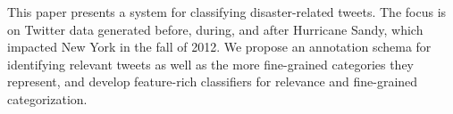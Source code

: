 This paper presents a system for classifying disaster-related tweets. The focus is on Twitter data generated before, during, and after Hurricane Sandy, which impacted New York in the fall of 2012. We propose an annotation schema for identifying relevant tweets as well as the more fine-grained categories they represent, and develop feature-rich classifiers for relevance and fine-grained categorization.
